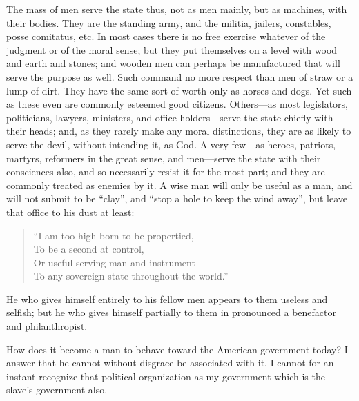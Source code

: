 \documentclass[letterpaper,12pt]{article}
\begin{document}
The mass of men serve the state thus, not as men mainly, but as machines, with
their bodies. They are the standing army, and the militia, jailers, constables,
posse comitatus, etc. In most cases there is no free exercise whatever of the
judgment or of the moral sense; but they put themselves on a level with wood and
earth and stones; and wooden men can perhaps be manufactured that will serve the
purpose as well. Such command no more respect than men of straw or a lump of
dirt. They have the same sort of worth only as horses and dogs. Yet such as
these even are commonly esteemed good citizens. Others---as most legislators,
politicians, lawyers, ministers, and office-holders---serve the state chiefly
with their heads; and, as they rarely make any moral distinctions, they are as
likely to serve the devil, without intending it, as God. A very few---as heroes,
patriots, martyrs, reformers in the great sense, and men---serve the state with
their consciences also, and so necessarily resist it for the most part; and they
are commonly treated as enemies by it. A wise man will only be useful as a man,
and will not submit to be \enquote{clay}, and \enquote{stop a hole to keep the
    wind away}, but leave that office to his dust at least:

\begin{verse}
    \enquote{I am too high born to be propertied, \\
        To be a second at control, \\
        Or useful serving-man and instrument \\
        To any sovereign state throughout the world.}
\end{verse}

He who gives himself entirely to his fellow men appears to them useless and
selfish; but he who gives himself partially to them in pronounced a benefactor
and philanthropist.

How does it become a man to behave toward the American government today?
I answer that he cannot without disgrace be associated with it. I cannot for an
instant recognize that political organization as my government which is the
slave's government also.
\end{document}
